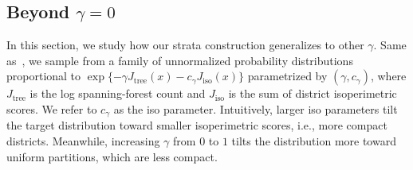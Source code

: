 \subsection{Beyond $\gamma=0$}
In this section, we study how our strata construction generalizes to other $\gamma$.
Same as~\cite{cyclewalk}, we sample from a family of unnormalized probability distributions proportional to $\exp\{-\gamma J_{\mathrm{tree}}(x)-c_\gamma J_{\mathrm{iso}}(x)\}$ parametrized by $(\gamma,c_\gamma)$, where $J_{\mathrm{tree}}$ is the log spanning-forest count and $J_{\mathrm{iso}}$ is the sum of district isoperimetric scores.
We refer to $c_\gamma$ as the iso parameter.
Intuitively, larger iso parameters tilt the target distribution toward smaller isoperimetric scores, i.e., more compact districts.
Meanwhile, increasing $\gamma$ from $0$ to $1$ tilts the distribution more toward uniform partitions, which are less compact.

